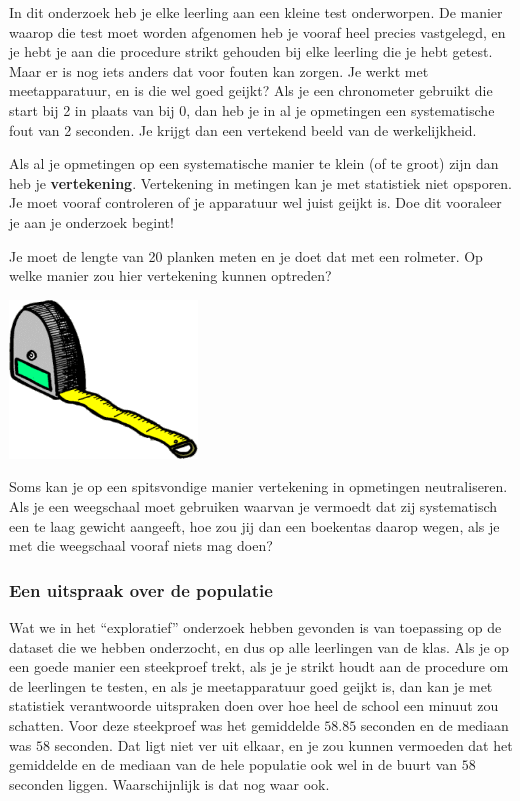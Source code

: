 \documentclass[12pt,twoside]{article}
\begin{document}
In dit onderzoek heb je elke leerling aan een kleine test onderworpen. De manier waarop die test
moet worden afgenomen heb je vooraf heel precies vastgelegd, en je hebt je aan die procedure strikt
gehouden bij elke leerling die je hebt getest. Maar er is nog iets anders dat voor fouten kan zorgen.
Je werkt met meetapparatuur, en is die wel goed geijkt? Als je een chronometer gebruikt die start bij
2 in plaats van bij 0, dan heb je in al je opmetingen een systematische fout van 2 seconden. Je krijgt
dan een vertekend beeld van de werkelijkheid.

Als al je opmetingen op een systematische manier te klein (of te groot) zijn dan heb je {\bf vertekening}.
Vertekening in metingen kan je met statistiek niet opsporen. Je moet vooraf controleren of je
apparatuur wel juist geijkt is. Doe dit vooraleer je aan je onderzoek begint!

\begin{oefening}
Je moet de lengte van 20 planken meten en je doet dat met een rolmeter. Op welke manier
zou hier vertekening kunnen optreden?
\end{oefening}

\begin{center}
\includegraphics[width=5cm]{rolmeter}
\end{center}

\begin{oefening}
Soms kan je op een spitsvondige manier vertekening in opmetingen neutraliseren. Als je een
weegschaal moet gebruiken waarvan je vermoedt dat zij systematisch een te laag gewicht
aangeeft, hoe zou jij dan een boekentas daarop wegen, als je met die weegschaal vooraf niets
mag doen?
\ruitjes{7cm}
\end{oefening}

\subsubsection{Een uitspraak over de populatie}

Wat we in het “exploratief” onderzoek hebben gevonden is van toepassing op de dataset die we hebben
onderzocht, en dus op alle leerlingen van de klas. Als je op een goede manier een steekproef trekt, als je je
strikt houdt aan de procedure om de leerlingen te testen, en als je meetapparatuur goed geijkt is, dan
kan je met statistiek verantwoorde uitspraken doen over hoe heel de school een minuut zou schatten.
Voor deze steekproef was het gemiddelde $58.85$ seconden en de mediaan was $58$ seconden. Dat ligt
niet ver uit elkaar, en je zou kunnen vermoeden dat het gemiddelde en de mediaan van de hele
populatie ook wel in de buurt van $58$ seconden liggen. Waarschijnlijk is dat nog waar ook.
\end{document}
